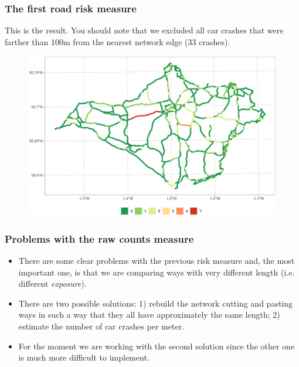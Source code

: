 \documentclass[c,10pt,pdftex]{beamer}
\begin{document}
\begin{frame}
\frametitle{The first road risk measure}
\vspace{-0.25cm}
This is the result. You should note that we excluded all car crashes that were farther than 100m from the nearest network edge (33  crashes). 
\begin{figure}
	\centering
	\includegraphics[width=\linewidth]{images/count_on_nearest_street}
\end{figure}
\end{frame}

\begin{frame}
\frametitle{Problems with the raw counts measure}
\begin{itemize}
	\setlength\itemsep{1em}
	\item There are some clear problems with the previous risk measure and, the most important one, is that we are comparing ways with very different length (i.e. different \textit{exposure}). 
	\item There are two possible solutions: 1) rebuild the network cutting and pasting ways in such a way that they all have approximately the same length; 2) estimate the number of car crashes per meter. 
	\item For the moment we are working with the second solution since the other one is much more difficult to implement. 
\end{itemize}
\end{frame}
\end{document}
